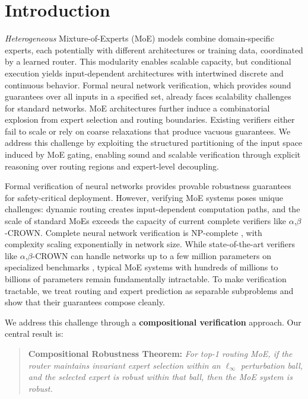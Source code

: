 \documentclass{article}
\theoremstyle{plain}
\theoremstyle{remark}
\begin{document}
\section{Introduction}

\textit{Heterogeneous} Mixture-of-Experts (MoE) models combine domain-specific experts, each potentially with different architectures or training data, coordinated by a learned router. This modularity enables scalable capacity, but conditional execution yields input-dependent architectures with intertwined discrete and continuous behavior. Formal neural network verification, which provides sound guarantees over all inputs in a specified set, already faces scalability challenges for standard networks. MoE architectures further induce a combinatorial explosion from expert selection and routing boundaries. Existing verifiers either fail to scale or rely on coarse relaxations that produce vacuous guarantees. We address this challenge by exploiting the structured partitioning of the input space induced by MoE gating, enabling sound and scalable verification through explicit reasoning over routing regions and expert-level decoupling.

Formal verification of neural networks provides provable robustness guarantees for safety-critical deployment. However, verifying MoE systems poses unique challenges: dynamic routing creates input-dependent computation paths, and the scale of standard MoEs exceeds the capacity of current complete verifiers like $\alpha$,$\beta$-CROWN. Complete neural network verification is NP-complete \citep{katz2017}, with complexity scaling exponentially in network size. While state-of-the-art verifiers like $\alpha$,$\beta$-CROWN can handle networks up to a few million parameters on specialized benchmarks \citep{brix2024}, typical MoE systems with hundreds of millions to billions of parameters remain fundamentally intractable. To make verification tractable, we treat routing and expert prediction as separable subproblems and show that their guarantees compose cleanly.

We address this challenge through a \textbf{compositional verification} approach. Our central result is:

\begin{quote}
\textbf{Compositional Robustness Theorem:} \textit{For top-1 routing MoE, if the router maintains invariant expert selection within an $\ell_\infty$ perturbation ball, and the selected expert is robust within that ball, then the MoE system is robust.}
\end{quote}
\end{document}
